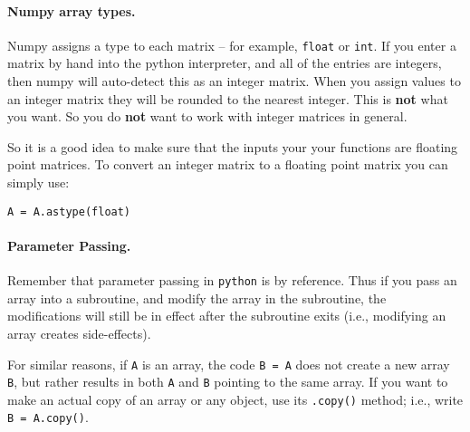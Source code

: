 \documentclass{article}
\begin{document}
\paragraph{Numpy array types.} Numpy assigns a type to each matrix --
for example, \texttt{float} or \texttt{int}.  If you enter a matrix by hand into the
python interpreter, and all of the entries are integers, then numpy will
auto-detect this as an integer matrix.  When you assign values to an
integer matrix they will be rounded to the nearest integer.  This is \textbf{not}
what you want.  So you do \textbf{not} want to work with integer matrices in
general.  

So it is a good idea to make sure that the inputs your your functions are floating point matrices.
To convert an integer matrix to a floating point matrix you can simply
use:
\begin{verbatim}
A = A.astype(float)
\end{verbatim}

\paragraph{Parameter Passing.}  Remember that parameter passing in \texttt{python} is by reference.   Thus if you pass an array into a subroutine, and modify the array in the subroutine, the modifications will still be in effect after the subroutine exits (i.e., modifying an array creates side-effects).

For similar reasons, if \texttt{A} is an array, the code \texttt{B = A} does not create a new array \texttt{B}, but rather results in both \texttt{A} and \texttt{B} pointing to the same array.   If you want to make an actual copy of an array or any object, use its \texttt{.copy()} method; i.e., write \texttt{B = A.copy()}. 
\end{document}
